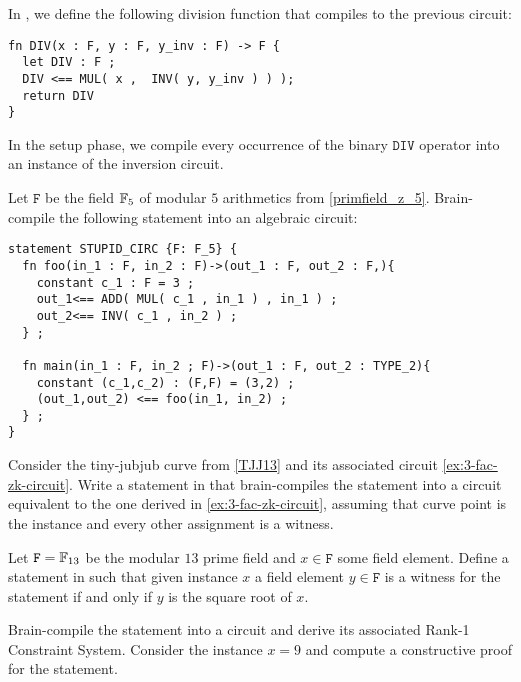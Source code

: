 In , we define the following division function that compiles to the previous circuit:
\begin{lstlisting}
fn DIV(x : F, y : F, y_inv : F) -> F {
  let DIV : F ;
  DIV <== MUL( x ,  INV( y, y_inv ) ) );
  return DIV
}
\end{lstlisting}
In the setup phase, we compile every occurrence of the binary $\mathtt{DIV}$ operator into an instance of the inversion circuit.
\begin{exercise} Let $\mathtt{F}$ be the field $\mathbb{F}_5$ of modular $5$ arithmetics from \examplename{} \ref{primfield_z_5}. Brain-compile the following  statement into an algebraic circuit:
\begin{lstlisting}
statement STUPID_CIRC {F: F_5} {
  fn foo(in_1 : F, in_2 : F)->(out_1 : F, out_2 : F,){
    constant c_1 : F = 3 ;
    out_1<== ADD( MUL( c_1 , in_1 ) , in_1 ) ;
    out_2<== INV( c_1 , in_2 ) ;
  } ;
    
  fn main(in_1 : F, in_2 ; F)->(out_1 : F, out_2 : TYPE_2){
	constant (c_1,c_2) : (F,F) = (3,2) ;
    (out_1,out_2) <== foo(in_1, in_2) ;
  } ;
}
\end{lstlisting}
\end{exercise}
\begin{exercise} Consider the tiny-jubjub curve from \examplename{} \ref{TJJ13} and its associated circuit \ref{ex:3-fac-zk-circuit}. Write a statement in  that brain-compiles the statement into a circuit equivalent to the one derived in \ref{ex:3-fac-zk-circuit}, assuming that curve point is the instance and every other assignment is a witness. 
\end{exercise}
\begin{exercise} Let $\mathtt{F}=\mathbb{F}_{13}$ be the modular $13$ prime field and $x\in\mathtt{F}$ some field element. Define a statement in  such that given instance $x$ a field element $y\in\mathtt{F}$ is a witness for the statement if and only if $y$ is the square root of $x$.  

Brain-compile the statement into a circuit and derive its associated Rank-1 Constraint System. Consider the instance $x=9$ and compute a constructive proof for the statement. 
\begin{comment}
\begin{lstlisting}
statement KNOWLEDGE_OF_SQUARE_ROOT {F} {
  fn SQUARE(x : F)->(xx : F){
    xx<== MUL( x , x ) ;
  } ;
    
  fn main(pub x : F, y : F )->(){
    constant c_1 : F = 0 ;
    c_1 <==  SUB( x , SQUARE( y , y ) );
  } ;
}
\end{lstlisting}
\end{comment}
\end{exercise}
